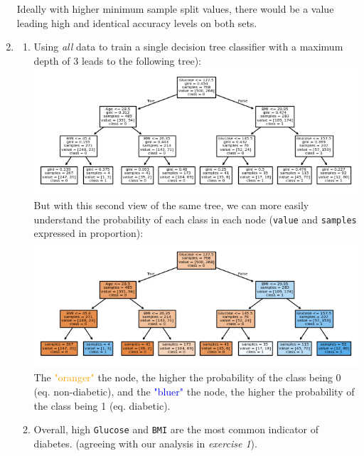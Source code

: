 \documentclass[12pt]{article}
\begin{document}
\begin{enumerate}[leftmargin=\labelsep, label=\textbf{\arabic*.)}]
          Ideally with higher minimum sample split values, there would be a value leading high and identical accuracy levels on both sets.
    \item \begin{enumerate}[label=\textbf{\roman*.)}]
              \item Using \textit{all} data to train a single decision tree classifier with a maximum depth of 3 leads to the following tree):\\
                    \includegraphics{decision_tree_value_counts.png}\\
                    \vspace{2em}
                    But with this second view of the same tree, we can more easily understand the probability of each class in each node (\texttt{value} and \texttt{samples} expressed in proportion):\\
                    \includegraphics{decision_tree.png} \\
                    The \textcolor{orange}{"oranger"} the node, the higher the probability of the class being 0 (eq. non-diabetic), and the \textcolor{blue}{"bluer"} the node, the higher the probability of the class being 1 (eq. diabetic). \\
              \item Overall, high \texttt{Glucose} and \texttt{BMI} are the most common indicator of diabetes. (agreeing with our analysis in \textit{exercise 1}).


\end{enumerate}
\end{enumerate}
\end{document}
